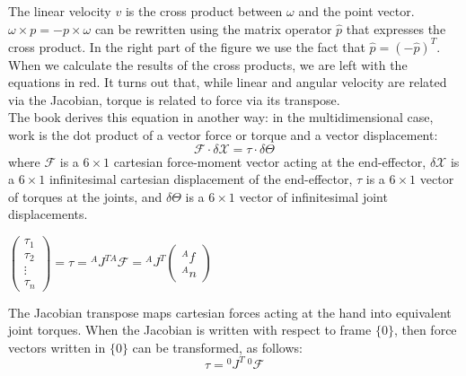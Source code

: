 The linear velocity $v$ is the cross product between $\omega$ and the point vector. $\omega \times p = - p \times \omega$ can be rewritten using the matrix operator $\hat{p}$ that expresses the cross product. In the right part of the figure we use the fact that $\hat{p} = (-\hat{p})^T$. When we calculate the results of the cross products, we are left with the equations in red. It turns out that, while linear and angular velocity are related via the Jacobian, torque is related to force via its transpose.\\

The book derives this equation in another way: in the multidimensional case, work is the dot product of a vector force or torque and a vector displacement:
\[ \mathcal{F} \cdot \delta \mathcal{X} = \tau \cdot \delta \Theta  \]
where $ \mathcal{F} $ is a $6\times1$ cartesian force-moment vector acting at the end-effector, $ \delta \mathcal{X} $ is a $6\times1$ infinitesimal cartesian displacement of the end-effector, $ \tau $ is a $6\times1$ vector of torques at the joints, and $ \delta \Theta $ is a $6\times1$ vector of infinitesimal joint displacements. 

\begin{center}
	$\left(\begin{array}{c}
\tau_{1} \\
\tau_{2} \\
\vdots \\
\tau_{n}
\end{array}\right)=\tau={ }^{A} J^{T A} \mathcal{F}={ }^{A} J^{T}\left(\begin{array}{c}
{}^{A}f \\
{}^{A}n
\end{array}\right)$
\end{center}

The Jacobian transpose maps cartesian forces acting at the hand into equivalent joint torques. When the Jacobian is written with respect to frame $\{0\}$, then force vectors written in $\{0\}$ can be transformed, as follows:
\[ \tau = {}^0 J^T \ {}^0\mathcal{F} \]


